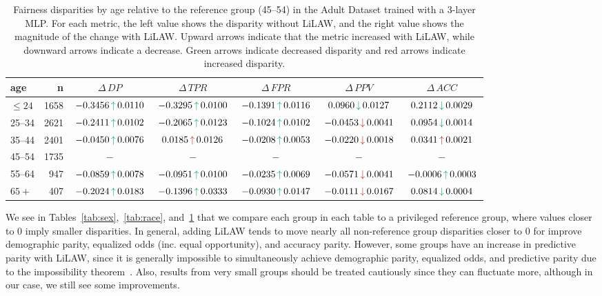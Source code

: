 \documentclass{article}
\theoremstyle{plain}
\theoremstyle{definition}
\theoremstyle{remark}
\begin{document}
\begin{table}[h!]
\centering
\scriptsize
\setlength{\tabcolsep}{3pt}
\renewcommand{\arraystretch}{1.15}
{%
\begin{tabular}{lrccccc}
\toprule
age & n & $\Delta\,DP$ & $\Delta\,TPR$ & $\Delta\,FPR$ & $\Delta\,PPV$ & $\Delta\,ACC$\\
\midrule
$\leq 24$     & 1658 & $\,-0.3456\,\Up\,0.0110\,$ & $\,-0.3295\,\Up\,0.0100\,$ & $\,-0.1391\,\Up\,0.0116\,$ & \hspace{1em}$\,0.0960\,\Downg\,0.0127\,$ & $\,0.2112\,\Downg\,0.0029\,$\\
25--34        & 2621 & $\,-0.2411\,\Up\,0.0102\,$ & $\,-0.2065\,\Up\,0.0123\,$ & $\,-0.1024\,\Up\,0.0102\,$ & $\,-0.0453\,\Down\,0.0041\,$ & $\,0.0954\,\Downg\,0.0014\,$ \\
35--44        & 2401 & $\,-0.0450\,\Up\,0.0076\,$ & \hspace{1em}$\,0.0185\,\Upr\,0.0126\,$ & $\,-0.0208\,\Up\,0.0053\,$ & $\,-0.0220\,\Down\,0.0018\,$ & $\,0.0341\,\Upr\,0.0021\,$  \\
45--54        & 1735 & $-$ & $-$ & $-$ & $-$ & $-$ \\
55--64        & 947  & $\,-0.0859\,\Up\,0.0078\,$ & $\,-0.0951\,\Up\,0.0100\,$ & $\,-0.0235\,\Up\,0.0069\,$ & $\,-0.0571\,\Down\,0.0041\,$ & \hspace{-1em}$\,-0.0006\,\Up\,0.0003\,$  \\
$65+$         & 407  & $\,-0.2024\,\Up\,0.0183\,$ & $\,-0.1396\,\Up\,0.0333\,$ & $\,-0.0930\,\Up\,0.0147\,$ & $\,-0.0111\,\Down\,0.0167\,$ & $\,0.0814\,\Downg\,0.0004\,$  \\
\bottomrule
\end{tabular}%
}
\caption{Fairness disparities by age relative to the reference group (45--54) in the Adult Dataset trained with a 3-layer MLP. For each metric, the left value shows the disparity without LiLAW, and the right value shows the magnitude of the change with LiLAW. Upward arrows indicate that the metric increased with LiLAW, while downward arrows indicate a decrease. Green arrows indicate decreased disparity and red arrows indicate increased disparity.}
\label{tab:age}
\end{table}

We see in Tables~\ref{tab:sex},~\ref{tab:race}, and~\ref{tab:age} that we compare each group in each table to a privileged reference group, where values closer to 0 imply smaller disparities. In general, adding LiLAW tends to move nearly all non-reference group disparities closer to 0 for improve demographic parity, equalized odds (inc. equal opportunity), and accuracy parity. However, some groups have an increase in predictive parity with LiLAW, since it is generally impossible to simultaneously achieve demographic parity, equalized odds, and predictive parity due to the impossibility theorem~\citep{imposs}. Also, results from very small groups should be treated cautiously since they can fluctuate more, although in our case, we still see some improvements.
\end{document}
